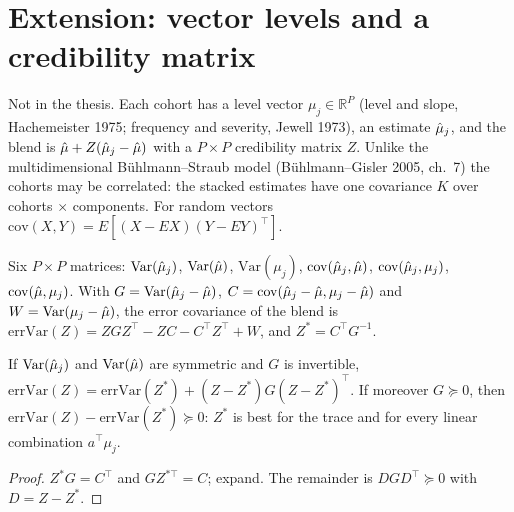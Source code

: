 \chapter{Extension: vector levels and a credibility matrix}\label{ch:corevector}

Not in the thesis. Each cohort has a level vector $\mu_j \in \mathbb{R}^P$
(level and slope, Hachemeister 1975; frequency and severity, Jewell 1973),
an estimate $\hat\mu_j$, and the blend is $\hat\mu + Z(\hat\mu_j - \hat\mu)$ with a
$P \times P$ credibility matrix $Z$. Unlike the multidimensional
Bühlmann--Straub model (Bühlmann--Gisler 2005, ch.~7) the cohorts may be
correlated: the stacked estimates have one covariance $K$ over
cohorts $\times$ components. For random vectors
$\mathrm{cov}(X, Y) = E[(X - EX)(Y - EY)^\top]$.

\begin{definition}\label{def:VBM}
  \leanok
  Six $P \times P$ matrices: $\mathrm{Var}(\hat\mu_j)$, $\mathrm{Var}(\hat\mu)$,
  $\mathrm{Var}(\mu_j)$, $\mathrm{cov}(\hat\mu_j, \hat\mu)$, $\mathrm{cov}(\hat\mu_j, \mu_j)$,
  $\mathrm{cov}(\hat\mu, \mu_j)$. With $G = \mathrm{Var}(\hat\mu_j - \hat\mu)$,
  $C = \mathrm{cov}(\hat\mu_j - \hat\mu, \mu_j - \hat\mu)$ and $W = \mathrm{Var}(\mu_j - \hat\mu)$,
  the error covariance of the blend is
  $\mathrm{errVar}(Z) = ZGZ^\top - ZC - C^\top Z^\top + W$, and
  $Z^\ast = C^\top G^{-1}$.
\end{definition}

\begin{theorem}\label{thm:VBM_optimal}
  \leanok
  If $\mathrm{Var}(\hat\mu_j)$ and $\mathrm{Var}(\hat\mu)$ are symmetric and $G$ is
  invertible, $\mathrm{errVar}(Z) = \mathrm{errVar}(Z^\ast) + (Z - Z^\ast)G(Z - Z^\ast)^\top$.
  If moreover $G \succeq 0$, then $\mathrm{errVar}(Z) - \mathrm{errVar}(Z^\ast) \succeq 0$:
  $Z^\ast$ is best for the trace and for every linear combination $a^\top\mu_j$.
\end{theorem}
\begin{proof}
  \leanok
  $Z^\ast G = C^\top$ and $GZ^{\ast\top} = C$; expand. The remainder is
  $DGD^\top \succeq 0$ with $D = Z - Z^\ast$.
\end{proof}

